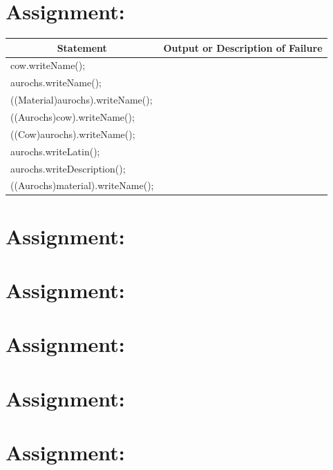 \documentclass[a4paper,12pt,oneside]{scrreprt}
\begin{document}
	\setcounter{chapter}{2} %
	\section{Assignment:}
	
	\begin{table}[h]
		\centering
		\resizebox{\textwidth}{!}
		{%
			\begin{tabular}{|l|l|}
				\hline
				\multicolumn{1}{|c|}{\textbf{Statement}} & \multicolumn{1}{c|}{\textbf{Output or Description of Failure}} \\ \hline
				cow.writeName();                         &                                                                \\ \hline
				aurochs.writeName();                     &                                                                \\ \hline
				((Material)aurochs).writeName();         &                                                                \\ \hline
				((Aurochs)cow).writeName();              &                                                                \\ \hline
				((Cow)aurochs).writeName();              &                                                                \\ \hline
				aurochs.writeLatin();                    &                                                                \\ \hline
				aurochs.writeDescription();            &                                                                \\ \hline
				((Aurochs)material).writeName();         &                                                                \\ \hline
			\end{tabular}
		}
	\end{table}
	
	\section{Assignment:}
	\section{Assignment:}
	\section{Assignment:}
	\section{Assignment:}
	\section{Assignment:}
\end{document}
